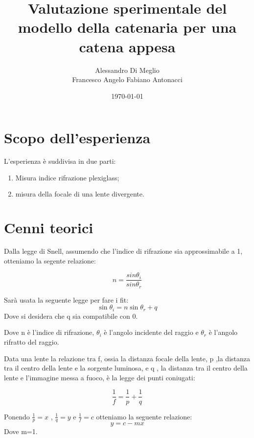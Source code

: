 \documentclass{article}
\title{Valutazione sperimentale del modello della catenaria per una catena appesa}
\author{Alessandro Di Meglio \\ Francesco Angelo Fabiano Antonacci}
\date{\today}
\begin{document}
\maketitle
\section{Scopo dell'esperienza}
L'esperienza è suddivisa in due parti:

\begin{enumerate}
\item Misura indice rifrazione plexiglass;
\item misura della focale di una lente divergente.

\end{enumerate}

\section{Cenni teorici}

Dalla legge di Snell, assumendo che l'indice di rifrazione sia approssimabile a 1, otteniamo la segente relazione:

	\begin{equation}
		n=\frac{sin\theta_i}{sin\theta_r}
			\label{eq:snell}
	\end{equation}

Sarà usata la seguente legge per fare i fit:
		\begin{equation}
				\sin{\theta_i}=n\sin{\theta_r}+q
							\label{eq:lin}
		\end{equation}
Dove si desidera che q sia compatibile con 0.

Dove n è l'indice di rifrazione, $\theta_i$ è l'angolo incidente del raggio e  $\theta_r$ è l'angolo  rifratto del raggio.

Data una lente la relazione tra f, ossia la distanza focale della lente, p ,la distanza tra il centro della lente e la sorgente luminosa, e q , la distanza tra il centro della lente e l'immagine messa a fuoco, è la legge dei punti coniugati:

\begin{equation}
\frac{1}{f}=\frac{1}{p}+\frac{1}{q}
\label{eq:pcon}
\end{equation}

Ponendo $\frac{1}{p}=x$ ,  $\frac{1}{q}=y$ e $\frac{1}{f}=c$ otteniamo la seguente relazione:
\begin{equation}
y=c-mx
\label{eq::)}
\end{equation}
Dove m=1.
\end{document}
